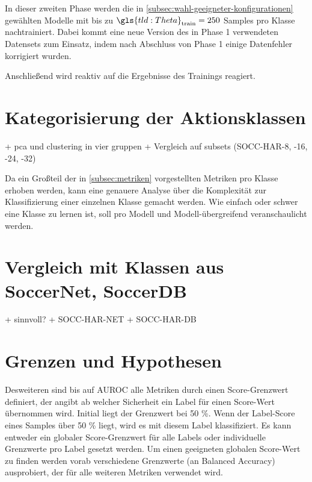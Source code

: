 In dieser zweiten Phase werden die in \autoref{subsec:wahl-geeigneter-konfigurationen} gewählten Modelle mit bis zu $\gls{tld:Theta}_\text{train} = 250$ Samples pro Klasse nachtrainiert.
Dabei kommt eine neue Version des in Phase 1 verwendeten Datensets zum Einsatz, indem nach Abschluss von Phase 1 einige Datenfehler korrigiert wurden.

Anschließend wird reaktiv auf die Ergebnisse des Trainings reagiert.

\section{Kategorisierung der Aktionsklassen}

+ pca und clustering in vier gruppen
+ Vergleich auf subsets (SOCC-HAR-8, -16, -24, -32)

Da ein Großteil der in \autoref{subsec:metriken} vorgestellten Metriken pro Klasse erhoben werden, kann eine genauere Analyse über die Komplexität zur Klassifizierung einer einzelnen Klasse gemacht werden.
Wie einfach oder schwer eine Klasse zu lernen ist, soll pro Modell und Modell-übergreifend veranschaulicht werden.

\section{Vergleich mit Klassen aus SoccerNet, SoccerDB}

+ sinnvoll?
+ SOCC-HAR-NET
+ SOCC-HAR-DB

\section{Grenzen und Hypothesen}


\begin{tcolorbox}[title=Todo]
    Desweiteren sind bis auf AUROC alle Metriken durch einen Score-Grenzwert definiert, der angibt ab welcher Sicherheit ein Label für einen Score-Wert übernommen wird.
    Initial liegt der Grenzwert bei 50 \%.
    Wenn der Label-Score eines Samples über 50 \% liegt, wird es \ua mit diesem Label klassifiziert.
    Es kann entweder ein globaler Score-Grenzwert für alle Labels oder individuelle Grenzwerte pro Label gesetzt werden.
    Um einen geeigneten globalen Score-Wert zu finden werden vorab verschiedene Grenzwerte (an Balanced Accuracy) ausprobiert, der für alle weiteren Metriken verwendet wird.
\end{tcolorbox}


